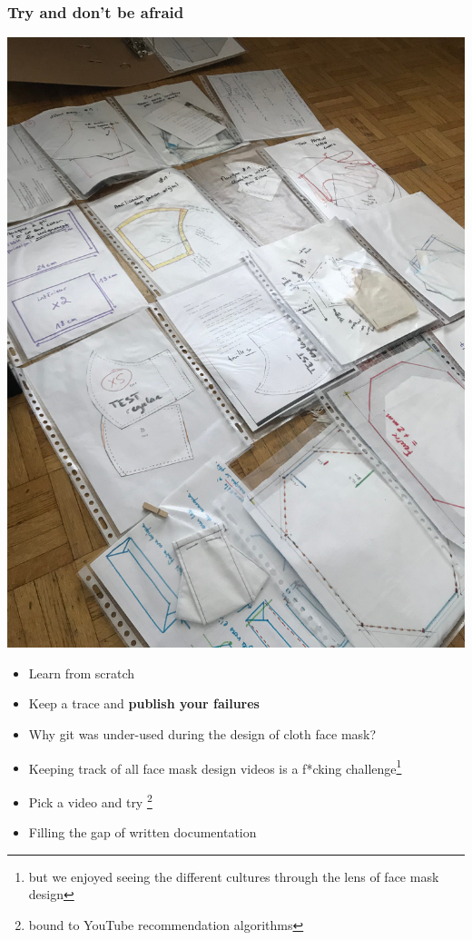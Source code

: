 \documentclass{beamer}
\begin{document}
\begin{frame}[fragile]
        \frametitle{Try and don't be afraid}

        \begin{multicols}{2}
\null \vfill
\includegraphics[scale=0.05]{./images/git-log.jpg}
        \vfill \null
        \columnbreak
        \null \vfill
        \begin{itemize}
                \item Learn from scratch
                \item Keep a trace and {\bf publish your failures}
                \item Why git was under-used during the design of cloth face mask?
                \item Keeping track of all face mask design videos is a f*cking challenge\footnote{{\tiny but we enjoyed seeing the different cultures through the lens of face mask design}}
                \item Pick a video and try \footnote{{\tiny bound to YouTube recommendation algorithms}}
                \item Filling the gap of written documentation
        \end{itemize}
         \vfill \null
\end{multicols}
\end{frame}
\end{document}
